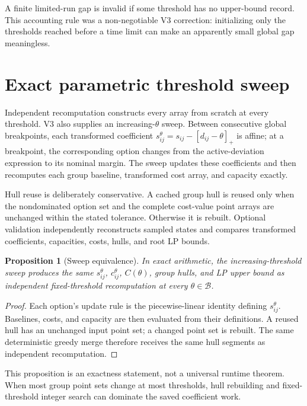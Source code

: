 \documentclass[11pt,a4paper]{article}
\newtheorem{proposition}[theorem]{Proposition}
\theoremstyle{definition}
\theoremstyle{remark}
\newcommand{\B}{\mathcal B}
\newcommand{\pos}[1]{[#1]_+}
\begin{document}
A finite limited-run gap is invalid if some threshold has no upper-bound
record. This accounting rule was a non-negotiable V3 correction: initializing
only the thresholds reached before a time limit can make an apparently small
global gap meaningless.

\section{Exact parametric threshold sweep}

Independent recomputation constructs every array from scratch at every
threshold. V3 also supplies an increasing-$\theta$ sweep. Between consecutive
global breakpoints, each transformed coefficient
$s_{ij}^{\theta}=s_{ij}-\pos{d_{ij}-\theta}$ is affine; at a breakpoint, the
corresponding option changes from the active-deviation expression to its
nominal margin. The sweep updates these coefficients and then recomputes each
group baseline, transformed cost array, and capacity exactly.

Hull reuse is deliberately conservative. A cached group hull is reused only
when the nondominated option set and the complete cost-value point arrays are
unchanged within the stated tolerance. Otherwise it is rebuilt. Optional
validation independently reconstructs sampled states and compares transformed
coefficients, capacities, costs, hulls, and root LP bounds.

\begin{proposition}[Sweep equivalence]
In exact arithmetic, the increasing-threshold sweep produces the same
$s_{ij}^{\theta}$, $c_{ij}^{\theta}$, $C(\theta)$, group hulls, and LP upper
bound as independent fixed-threshold recomputation at every
$\theta\in\B$.
\end{proposition}

\begin{proof}
Each option's update rule is the piecewise-linear identity defining
$s_{ij}^{\theta}$. Baselines, costs, and capacity are then evaluated from their
definitions. A reused hull has an unchanged input point set; a changed point
set is rebuilt. The same deterministic greedy merge therefore receives the
same hull segments as independent recomputation.
\end{proof}

This proposition is an exactness statement, not a universal runtime theorem.
When most group point sets change at most thresholds, hull rebuilding and
fixed-threshold integer search can dominate the saved coefficient work.
\end{document}
